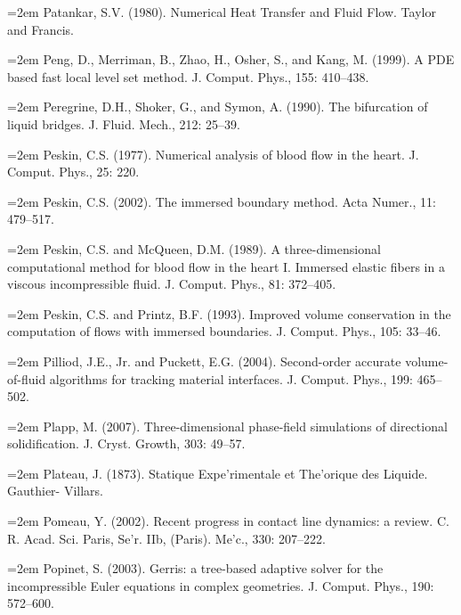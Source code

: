 \documentclass[11pt,a4paper,openany,fontset=none]{ctexbook}
\begin{document}
\par\hangindent=2em Patankar, S.V. (1980). Numerical Heat Transfer and Fluid Flow. Taylor and Francis.

\par\hangindent=2em Peng, D., Merriman, B., Zhao, H., Osher, S., and Kang, M. (1999). A PDE based fast local level set method. J. Comput. Phys., 155: 410--438.


\par\hangindent=2em Peregrine, D.H., Shoker, G., and Symon, A. (1990). The bifurcation of liquid bridges. J. Fluid. Mech., 212: 25--39.

\par\hangindent=2em Peskin, C.S. (1977). Numerical analysis of blood flow in the heart. J. Comput. Phys., 25: 220.

\par\hangindent=2em Peskin, C.S. (2002). The immersed boundary method. Acta Numer., 11: 479--517.

\par\hangindent=2em Peskin, C.S. and McQueen, D.M. (1989). A three-dimensional computational method for blood flow in the heart I. Immersed elastic fibers in a viscous incompressible fluid. J. Comput. Phys., 81: 372--405.

\par\hangindent=2em Peskin, C.S. and Printz, B.F. (1993). Improved volume conservation in the computation of flows with immersed boundaries. J. Comput. Phys., 105: 33--46.

\par\hangindent=2em Pilliod, J.E., Jr. and Puckett, E.G. (2004). Second-order accurate volume-of-fluid algorithms for tracking material interfaces. J. Comput. Phys., 199: 465--502.

\par\hangindent=2em Plapp, M. (2007). Three-dimensional phase-field simulations of directional solidification. J. Cryst. Growth, 303: 49--57.

\par\hangindent=2em Plateau, J. (1873). Statique Expe'rimentale et The'orique des Liquide. Gauthier- Villars.

\par\hangindent=2em Pomeau, Y. (2002). Recent progress in contact line dynamics: a review. C. R. Acad. Sci. Paris, Se'r. IIb, (Paris). Me'c., 330: 207--222.

\par\hangindent=2em Popinet, S. (2003). Gerris: a tree-based adaptive solver for the incompressible Euler equations in complex geometries. J. Comput. Phys., 190: 572--600.
\end{document}
